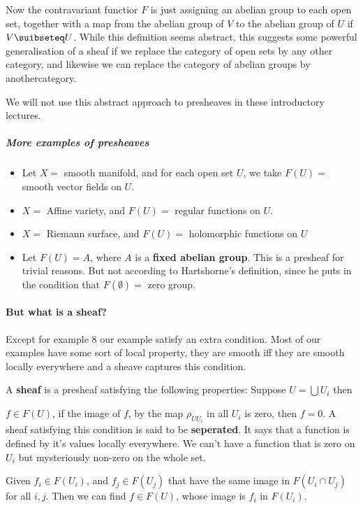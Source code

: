 Now the contravariant functior $F$ is just assigning an abelian group to each open set, together with a map from the abelian group of $V$ to the abelian group of $U$ if $V\suibseteq U$.
While this definition seems abstract, this suggests some powerful generalisation of a sheaf if we replace the category of open sets by any other category, and likewise we can replace the category of abelian groups by anothercategory.

We will not use this abstract approach to presheaves in these introductory lectures.

\subparagraph{More examples of presheaves}
\begin{itemize}
\item \begin{example}
    Let $X = $ smooth manifold, and for each open set $U$, we take $F(U) = $ smooth vector fields on $U$.
\end{example}  
\item \begin{example}
  $X =$ Affine variety, and $F(U) = $ regular functions on $U$.
\end{example} 
\item \begin{example}
  $X =$ Riemann surface, and $F(U) = $ holomorphic functions on $U$
\end{example}
\item \begin{example}
    Let $F(U) = A$, where $A$ is a \textbf{fixed abelian group}. This is a presheaf for trivial reasons. But not according to Hartshorne's definition, since he puts in the condition that $F(\emptyset) = $ zero group.
\end{example}
\end{itemize}

\paragraph{But what is a sheaf?}
Except for example $8$ our example satisfy an extra condition. 
Most of our examples have some sort of local property, they are smooth iff they are smooth locally everywhere and a sheave captures this condition. 


\begin{definition}[]
    A \textbf{sheaf} is a presheaf satisfying the following properties: Suppose $U = \bigcup U_i$ then 
\begin{properties}
    \item $f\in F(U)$, if the image of $f$, by the map $\rho_{UU_i}$ in all $U_i$ is zero, then $f=0$. A sheaf satisfying this condition is said to be \textbf{seperated}. It says that a function is defined by it's values locally everywhere. We can't have a function that is zero on $U_i$ but mysteriously non-zero on the whole set.
    \item Given $f_i\in F(U_i)$,  and $f_j\in F(U_j)$ that have the same image in $F(U_i\cap U_j)$ for all  $i,j$. Then we can find $f\in F(U)$, whose image is $f_i$ in $F(U_i)$.
\end{properties}
\end{definition}


